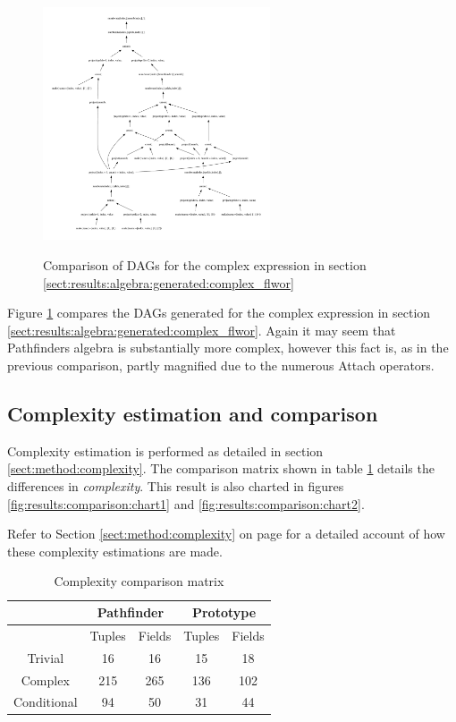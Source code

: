 \begin{figure}[!h]
{{			\includegraphics[width=0.6\textwidth]{img/graphs/td_impl_flwor_complex_xq_relalg_dag}
			\label{fig:result:comparison:complex_pathfinder_dag}
		}
	}
	\caption{Comparison of DAGs for the complex expression in section
	\ref{sect:results:algebra:generated:complex_flwor}}
	\label{fig:results:comp:complex}	
\end{figure}

Figure \ref{fig:results:comp:complex} compares the DAGs generated for the
complex expression in section
\ref{sect:results:algebra:generated:complex_flwor}. Again it may seem that
Pathfinders algebra is substantially more complex, however this fact is,
as in the previous comparison, partly magnified due to the numerous
\textsf{Attach} operators.

\newpage
\subsection{Complexity estimation and comparison}
Complexity estimation is performed as detailed in section
\ref{sect:method:complexity}. The comparison matrix shown in table
\ref{table:result:complexity_matrix} details the differences in
\textit{complexity}. This result is also charted in figures
\ref{fig:results:comparison:chart1} and \ref{fig:results:comparison:chart2}.

Refer to Section \ref{sect:method:complexity} on page
\pageref{sect:method:complexity} for a detailed account of how these complexity
estimations are made.

\begin{table}[!htp]
 \begin{center} 
 \begin{tabular}{| c | c | c || c | c |}
  \hline
   & \multicolumn{2}{|c||}{\textbf{Pathfinder}}
   & \multicolumn{2}{|c|}{\textbf{Prototype}} \\
   \hline
   & Tuples & Fields & Tuples & Fields \\  
   \hline
   Trivial & 16 & 16 & 15 & 18 \\  
   \hline
   Complex & 215 & 265 & 136 & 102 \\
   \hline
   Conditional & 94 & 50 & 31 & 44 \\  
   \hline
 \end{tabular}
\caption{Complexity comparison matrix}
\label{table:result:complexity_matrix}
 \end{center}
\end{table}

